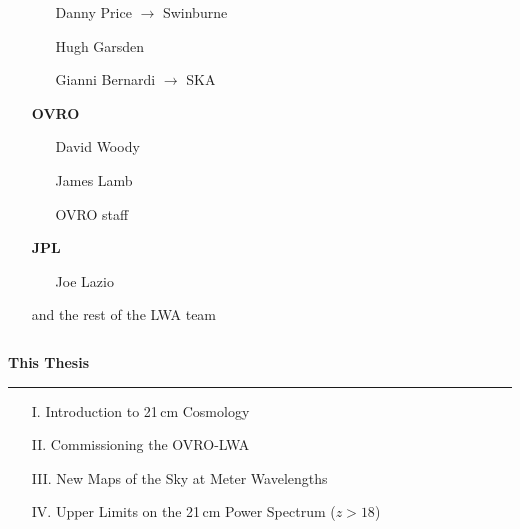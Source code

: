 \documentclass{beamer}
\begin{document}
\begin{frame}
\begin{columns}[t]
\begin{column}{0.4\textwidth}
\begin{itemize}[leftmargin=0in]
\begin{itemize}[leftmargin=0.5cm]
                        \item[] {\footnotesize Danny Price} {\tiny $\rightarrow$ Swinburne}
                        \item[] {\footnotesize Hugh Garsden}
                        \item[] {\footnotesize Gianni Bernardi} {\tiny $\rightarrow$ SKA}
                    \end{itemize}
                \item[] \textbf{OVRO}
                    \begin{itemize}[leftmargin=0.5cm]
                        \item[] {\footnotesize David Woody}
                        \item[] {\footnotesize James Lamb}
                        \item[] {\footnotesize OVRO staff}
                    \end{itemize}
                \item[] \textbf{JPL}
                    \begin{itemize}[leftmargin=0.5cm]
                        \item[] {\footnotesize Joe Lazio}
                    \end{itemize}
                \item[] {\footnotesize and the rest of the LWA team}
            \end{itemize}
        \end{column}
        \begin{column}{0.1\textwidth}
        \end{column}
    \end{columns}
\end{frame}

\begin{frame}

    {\Large \bfseries This Thesis}
    \vskip8pt
    \hrule
    \vskip8pt
    \begin{enumerate}
        \item[I.] Introduction to 21\,cm Cosmology
        \item[II.] Commissioning the OVRO-LWA
        \item[III.] New Maps of the Sky at Meter Wavelengths
        \item[IV.] Upper Limits on the 21\,cm Power Spectrum ($z>18$)
    \end{enumerate}
\end{frame}
\end{document}
